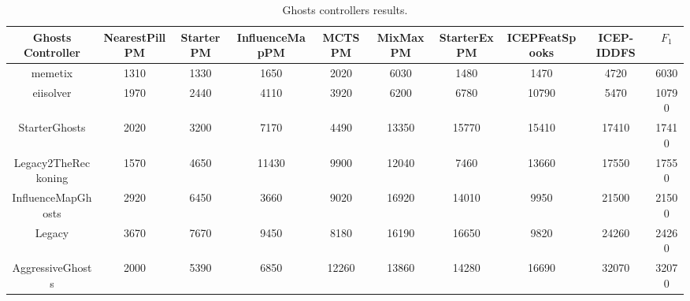 \documentclass[journal]{IEEEtran}
\begin{document}
\begin{table}
\caption{Ghosts controllers results.}
\label{tab:results_ghosts}
\centering
\footnotesize
\begin{tabular}{|c|cccccccc|c|}
\hline
Ghosts Controller & NearestPillPM & StarterPM & InfluenceMapPM & MCTSPM & MixMaxPM & StarterExPM & ICEPFeatSpooks & ICEP-IDDFS & $F_1$ \\
\hline
memetix \cite{Tose2012}	&	1310	&	1330	&	1650	&	2020	&	6030	&	1480	&	1470	&	4720	&	6030 \\
eiisolver \cite{Verhaard}	&	1970	&	2440	&	4110	&	3920	&	6200	&	6780	&	10790	&	5470	&	10790	\\
StarterGhosts	&	2020	&	3200	&	7170	&	4490	&	13350	&	15770	&	15410	&	17410	&	17410	\\
Legacy2TheReckoning	&	1570	&	4650	&	11430	&	9900	&	12040	&	7460	&	13660	&	17550	&	17550	\\
InfluenceMapGhosts	\cite{Svensson2012} &	2920	&	6450	&	3660	&	9020	&	16920	&	14010	&	9950	&	21500	&	21500	\\
Legacy	&	3670	&	7670	&	9450	&	8180	&	16190	&	16650	&	9820	&	24260	&	24260	\\
AggressiveGhosts	&	2000	&	5390	&	6850	&	12260	&	13860	&	14280	&	16690	&	32070	&	32070	\\
\hline
\end{tabular}
\end{table}
\end{document}

